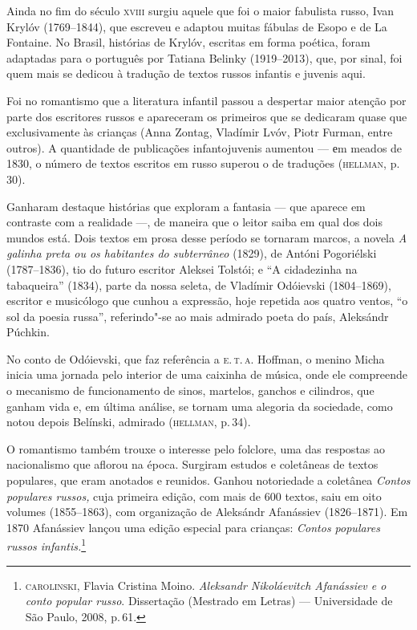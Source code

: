 Ainda no fim do século \textsc{xviii} surgiu aquele que foi o maior fabulista
russo, Ivan Krylóv (1769--1844), que escreveu e adaptou muitas fábulas
de Esopo e de La Fontaine. No Brasil, histórias de Krylóv, escritas em
forma poética, foram adaptadas para o português por Tatiana Belinky
(1919--2013), que, por sinal, foi quem mais se dedicou à tradução de
textos russos infantis e juvenis aqui.

Foi no romantismo que a literatura infantil passou a despertar maior
atenção por parte dos escritores russos e apareceram os primeiros que se
dedicaram quase que exclusivamente às crianças (Anna Zontag, Vladímir
Lvóv, Piotr Furman, entre outros). A quantidade de publicações infantojuvenis aumentou
--- еm meados de 1830, o número de textos escritos em russo superou o de
traduções (\textsc{hellman}, p.\,30).

Ganharam destaque histórias que exploram a fantasia --- que aparece em
contraste com a realidade ---, de maneira que o leitor saiba em qual dos
dois mundos está. Dois textos em prosa desse período se tornaram marcos,
a novela \emph{A galinha preta ou os habitantes do subterrâneo} (1829),
de Antóni Pogoriélski (1787--1836), tio do futuro escritor Aleksei
Tolstói; e ``A cidadezinha na tabaqueira'' (1834), parte
da nossa seleta, de Vladímir Odóievski (1804--1869), escritor e
musicólogo que cunhou a expressão, hoje repetida aos quatro ventos, ``o
sol da poesia russa'', referindo"-se ao mais admirado poeta do país,
Aleksándr Púchkin.

No conto de Odóievski, que faz referência a \textsc{e.\,t.\,a.} Hoffman, o menino
Micha inicia uma jornada pelo interior de uma caixinha de música, onde
ele compreende o mecanismo de funcionamento de sinos, martelos, ganchos
e cilindros, que ganham vida e, em última análise, se tornam uma
alegoria da sociedade, como notou depois Belínski, admirado (\textsc{hellman}, p.\,34).

O romantismo também trouxe o interesse pelo folclore, uma das respostas
ao nacionalismo que aflorou na época. Surgiram estudos e coletâneas de
textos populares, que eram anotados e reunidos. Ganhou notoriedade a
coletânea \emph{Contos populares russos,} cuja primeira edição, com mais
de 600 textos, saiu em oito volumes (1855--1863), com organização de
Aleksándr Afanássiev (1826--1871). Em 1870 Afanássiev lançou uma edição
especial para crianças: \emph{Contos populares russos
infantis.}\footnote{\textsc{carolinski}, Flavia Cristina Moino. \emph{Aleksandr
  Nikoláevitch Afanássiev e o conto popular russo}. Dissertação
  (Mestrado em Letras) --- Universidade de São Paulo, 2008, p.\,61.}

